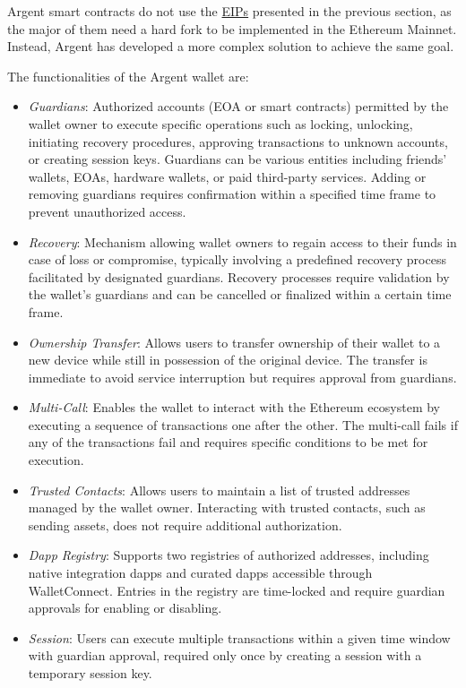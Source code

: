 Argent smart contracts do not use the \hyperref[subsec:eips]{EIPs} presented in the previous section, as the major of them need a hard fork to be implemented in the Ethereum Mainnet. Instead, Argent has developed a more complex solution to achieve the same goal. 


The functionalities of the Argent wallet are: \cite{argent-smart-wallet-specifications}
\begin{itemize}
    \item \textit{Guardians}: Authorized accounts (EOA or smart contracts) permitted by the wallet owner to execute specific operations such as locking, unlocking, initiating recovery procedures, approving transactions to unknown accounts, or creating session keys. Guardians can be various entities including friends' wallets, EOAs, hardware wallets, or paid third-party services. Adding or removing guardians requires confirmation within a specified time frame to prevent unauthorized access.
    \item \textit{Recovery}: Mechanism allowing wallet owners to regain access to their funds in case of loss or compromise, typically involving a predefined recovery process facilitated by designated guardians. Recovery processes require validation by the wallet's guardians and can be cancelled or finalized within a certain time frame.
    \item \textit{Ownership Transfer}: Allows users to transfer ownership of their wallet to a new device while still in possession of the original device. The transfer is immediate to avoid service interruption but requires approval from guardians.
    \item \textit{Multi-Call}: Enables the wallet to interact with the Ethereum ecosystem by executing a sequence of transactions one after the other. The multi-call fails if any of the transactions fail and requires specific conditions to be met for execution.
    \item \textit{Trusted Contacts}: Allows users to maintain a list of trusted addresses managed by the wallet owner. Interacting with trusted contacts, such as sending assets, does not require additional authorization.
    \item \textit{Dapp Registry}: Supports two registries of authorized addresses, including native integration dapps and curated dapps accessible through WalletConnect. Entries in the registry are time-locked and require guardian approvals for enabling or disabling.
    \item \textit{Session}: Users can execute multiple transactions within a given time window with guardian approval, required only once by creating a session with a temporary session key.

\end{itemize}

